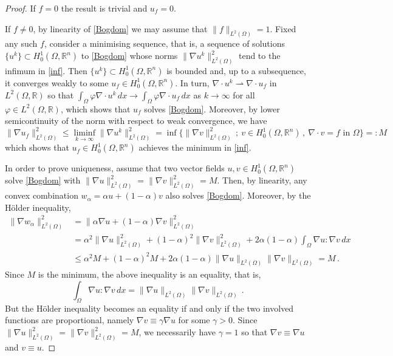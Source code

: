 \documentclass[11pt]{article}
\theoremstyle{plain}
\theoremstyle{definition}
\numberwithin{equation}{section}
\newcommand{\R}{\mathbb{R}}
\renewcommand{\phi}{\varphi}
\begin{document}
\begin{proof} If $f=0$ the result is trivial and $u_f=0$.\par
If $f\neq0$, by linearity of \eqref{Bogdom} we may assume that $\|f\|_{L^2(\Omega)}=1$. Fixed any such $f$, consider a minimising sequence,
that is,
a sequence of solutions $\{u^k\}\subset H_0^1(\Omega,\R^n)$ to \eqref{Bogdom} whose norms $\|\nabla u^k\|_{L^2(\Omega)}^2$ tend to the infimum in \eqref{inf}.
Then $\{u^k\}\subset H_0^1(\Omega,\R^n)$ is bounded and, up to a subsequence, it converges weakly to some $u_f\in H_0^1(\Omega,\R^n)$. In turn,
$\nabla\cdot u^k\rightharpoonup \nabla\cdot u_f$ in $L^2(\Omega,\R)$ so that $\int_\Omega \phi\nabla\cdot u^k\, dx\to\int_\Omega \phi\nabla\cdot u_f\, dx$ as
$k\to\infty$ for all $\phi\in L^2(\Omega,\R)$, which shows that $u_f$ solves \eqref{Bogdom}. Moreover, by lower semicontinuity of the norm with respect
to weak convergence, we have
$$
\|\nabla u_f\|_{L^2(\Omega)}^2 \le \liminf_{k\to\infty}\|\nabla u^k\|_{L^2(\Omega)}^2
= \inf\Big\{\|\nabla v\|_{L^2(\Omega)}^2\, ;\ v\in H^1_0(\Omega, \R^n)\, ,\ \nabla\cdot v=f\text{ in }\Omega\Big\}=:M
$$
which shows that $u_f\in H_0^1(\Omega,\R^n)$ achieves the minimum in \eqref{inf}.\par
In order to prove uniqueness, assume that two vector fields $u,v\in H^1_0(\Omega,\R^n)$ solve
\eqref{Bogdom} with $\|\nabla u\|_{L^2(\Omega)}^2=\|\nabla v\|_{L^2(\Omega)}^2=M$. Then, by linearity,
any convex combination $w_\alpha=\alpha u+(1-\alpha)v$ also solves \eqref{Bogdom}. Moreover, by the H\"older inequality,
\begin{align*}
\|\nabla w_\alpha\|_{L^2(\Omega)}^2 &= \|\alpha\nabla u+(1-\alpha)\nabla v\|_{L^2(\Omega)}^2\\
& = \alpha^2\|\nabla u\|_{L^2(\Omega)}^2
+(1-\alpha)^2\|\nabla v\|_{L^2(\Omega)}^2+2\alpha(1-\alpha)\int_\Omega\nabla u : \nabla v\, dx\\
& \le \alpha^2 M+(1-\alpha)^2M+2\alpha(1-\alpha)\|\nabla u\|_{L^2(\Omega)}\|\nabla v\|_{L^2(\Omega)}=M\, .
\end{align*}
Since $M$ is the minimum, the above inequality is an equality, that is,
$$
\int_\Omega\nabla u : \nabla v\, dx=\|\nabla u\|_{L^2(\Omega)}\|\nabla v\|_{L^2(\Omega)}\, .
$$
But the H\"older inequality becomes an equality if and only if the two involved functions are proportional, namely
$\nabla v\equiv\gamma \nabla u$ for some $\gamma>0$. Since $\|\nabla u\|_{L^2(\Omega)}^2=\|\nabla v\|_{L^2(\Omega)}^2=M$, we necessarily
have $\gamma=1$ so that $\nabla v\equiv\nabla u$ and $v\equiv u$.

\end{proof}
\end{document}
